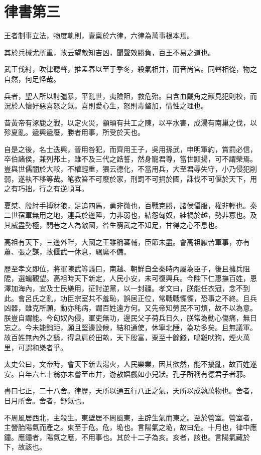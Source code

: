 \chapter{律書第三}

王者制事立法，物度軌則，壹稟於六律，六律為萬事根本焉。

其於兵械尤所重，故云望敵知吉凶，聞聲效勝負，百王不易之道也。

武王伐紂，吹律聽聲，推孟春以至于季冬，殺氣相并，而音尚宮。同聲相從，物之自然，何足怪哉。

兵者，聖人所以討彊暴，平亂世，夷險阻，救危殆。自含血戴角之獸見犯則校，而況於人懷好惡喜怒之氣。喜則愛心生，怒則毒螫加，情性之理也。

昔黃帝有涿鹿之戰，以定火災，顓頊有共工之陳，以平水害，成湯有南巢之伐，以殄夏亂。遞興遞廢，勝者用事，所受於天也。

自是之後，名士迭興，晉用咎犯，而齊用王子，吳用孫武，申明軍約，賞罰必信，卒伯諸侯，兼列邦土，雖不及三代之誥誓，然身寵君尊，當世顯揚，可不謂榮焉。豈與世儒闇於大較，不權輕重，猥云德化，不當用兵，大至君辱失守，小乃侵犯削弱，遂執不移等哉。笔教笞不可廢於家，刑罰不可捐於國，誅伐不可偃於天下，用之有巧拙，行之有逆順耳。

夏桀、殷紂手搏豺狼，足追四馬，勇非微也，百戰克勝，諸侯懾服，權非輕也。秦二世宿軍無用之地，連兵於邊陲，力非弱也，結怨匈奴，絓禍於越，勢非寡也。及其威盡勢極，閭巷之人為敵國，咎生窮武之不知足，甘得之心不息也。

高祖有天下，三邊外畔，大國之王雖稱蕃輔，臣節未盡。會高祖厭苦軍事，亦有蕭、張之謀，故偃武一休息，羈縻不備。

歷至孝文即位，將軍陳武等議曰，南越、朝鮮自全秦時內屬為臣子，後且擁兵阻阸，選蠕觀望。高祖時天下新定，人民小安，未可復興兵。今陛下仁惠撫百姓，恩澤加海內，宜及士民樂用，征討逆黨，以一封疆。孝文曰，朕能任衣冠，念不到此。會呂氏之亂，功臣宗室共不羞恥，誤居正位，常戰戰慄慄，恐事之不終。且兵凶器，雖克所願，動亦秏病，謂百姓遠方何。又先帝知勞民不可煩，故不以為意。朕豈自謂能。今匈奴內侵，軍吏無功，邊民父子荷兵日久，朕常為動心傷痛，無日忘之。今未能銷距，願且堅邊設候，結和通使，休寧北陲，為功多矣。且無議軍。故百姓無內外之繇，得息肩於田畝，天下殷富，粟至十餘錢，鳴雞吠狗，煙火萬里，可謂和樂者乎。

太史公曰，文帝時，會天下新去湯火，人民樂業，因其欲然，能不擾亂，故百姓遂安。自年六七十翁亦未嘗至市井，游敖嬉戲如小兒狀。孔子所稱有德君子者邪。

書曰七正，二十八舍。律歷，天所以通五行八正之氣，天所以成孰萬物也。舍者，日月所舍。舍者，舒氣也。

不周風居西北，主殺生。東壁居不周風東，主辟生氣而東之。至於營室。營室者，主營胎陽氣而產之。東至于危。危，垝也。言陽氣之垝，故曰危。十月也，律中應鐘。應鐘者，陽氣之應，不用事也。其於十二子為亥。亥者，該也。言陽氣藏於下，故該也。

